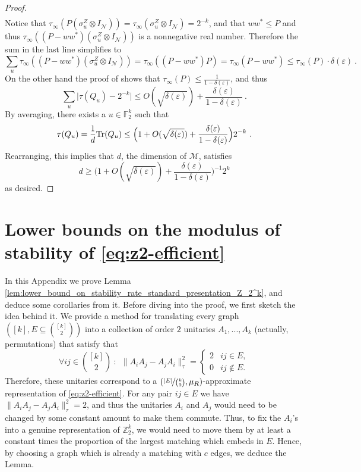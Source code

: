 \documentclass[11pt]{article}
\theoremstyle{definition}
\newcommand{\Tr}{\mbox{\rm Tr}}
\newcommand{\F}{\ensuremath{\mathbb{F}}}
\newcommand{\Z}{\ensuremath{\mathbb{Z}}}
\newcommand{\mM}{\ensuremath{\mathcal{M}}}
\newcommand{\eps}{\varepsilon}
\newcommand{\mN}{\mathcal{N}}
\begin{document}
\begin{proof}
\begin{align*}
\end{align*}
Notice that $\tau_\infty (P (\sigma^Z_u \otimes I_\mN)) = \tau_\infty (\sigma^Z_u \otimes I_\mN) = 2^{-k}$, and that $ww^* \leq P$ and thus $\tau_\infty((P - ww^*)(\sigma^Z_u \otimes I_\mN))$ is a nonnegative real number. Therefore the sum in the last line simplifies to
\[
\sum_u \tau_\infty((P - ww^*)(\sigma^Z_u \otimes I_\mN)) = \tau_\infty((P - ww^*) P) = \tau_\infty(P - ww^*) \leq \tau_\infty(P) \cdot \delta(\eps)~.
\]
On the other hand the proof of  shows that $\tau_\infty(P) \leq \frac{1}{1 - \delta(\eps)}$, and thus 
\[
\sum_u \Big| \tau(Q_u) - 2^{-k} \Big| \leq O(\sqrt{\delta(\eps)}) + \frac{\delta(\eps)}{1 - \delta(\eps)}~.
\]
By averaging, there exists a $u \in \F_2^k$ such that
\[
\tau(Q_u) = \frac{1}{d} \Tr(Q_u) \leq  \Big( 1 + O(\sqrt{\delta(\eps)}) + \frac{\delta(\eps)}{1 - \delta(\eps)}\Big) 2^{-k}~.
\]
Rearranging, this implies that $d$, the dimension of $\mM$, satisfies
\[
	d \geq \Big( 1 + O(\sqrt{\delta(\eps)}) + \frac{\delta(\eps)}{1 - \delta(\eps)}\Big)^{-1} 2^k
\]
as desired.
\end{proof}

\appendix
\section{Lower bounds on the modulus of stability of \eqref{eq:z2-efficient}}\label{appendix:lower_bounds}
In this Appendix we prove Lemma \ref{lem:lower_bound_on_stability_rate_standard_presentation_Z_2^k}, and deduce some corollaries from it. 
Before diving into the proof, we first sketch the idea behind it. 
We provide a method for translating every graph $([k],E\subseteq{\binom{[k]}{2}})$ into a collection of order $2$ unitaries $A_1,...,A_k$ (actually, permutations) that satisfy that
\begin{equation}\label{eq:commuting_or_not}
   \forall ij\in \binom{[k]}{2}\ \colon\ \ \|A_iA_j-A_jA_i\|_\tau^2=\begin{cases}
    2 & ij\in E,\\
    0 & ij\notin E.
\end{cases} 
\end{equation}
Therefore, these unitaries correspond to a $(\nicefrac{|E|}{\binom{k}{2}},\mu_R)$-approximate representation of \eqref{eq:z2-efficient}. For any pair $ij\in E$ we have $\|A_iA_j-A_jA_i\|_\tau^2=2$, and thus the unitaries $A_i$ and $A_j$ would need to be changed  by some constant amount to make them commute. Thus, to fix the $A_i$'s into a genuine representation of $\Z_2^k$, we would need to move them by at least a constant times the proportion of the largest   matching which embeds in $E$. Hence, by choosing a graph which is already a  matching with $c$ edges, we deduce the Lemma. 
\end{document}
